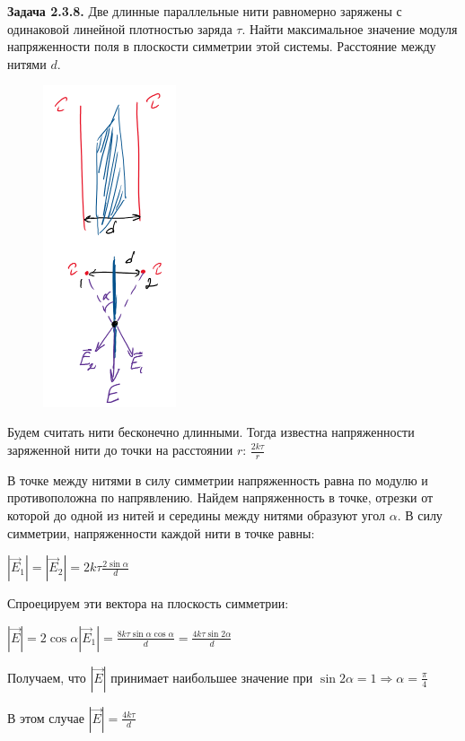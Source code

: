 \documentclass[12pt]{article}
\begin{document}





\clearpage

\begin{tcolorbox}
    \textbf{Задача 2.3.8.} Две длинные параллельные нити равномерно
    заряжены с одинаковой линейной плотностью заряда $\tau$. Найти
    максимальное значение модуля напряженности поля в плоскости
    симметрии этой системы. Расстояние между нитями $d$.
\end{tcolorbox}

\begin{minipage}{\textwidth}
    \begin{figure}
        \includegraphics[width=0.35\textwidth]{physics1/images/physics1_homework_7_1}
    \end{figure}

    Будем считать нити бесконечно длинными. Тогда известна напряженности заряженной нити до точки на расстоянии $r$: $\frac{2k\tau}{r}$

    В точке между нитями в силу симметрии напряженность равна по модулю и противоположна по напрявлению. Найдем напряженность в точке,
    отрезки от которой до одной из нитей и середины между нитями образуют угол $\alpha$. В силу симметрии, напряженности
    каждой нити в точке равны:

    $|\vec{E}_1| = |\vec{E}_2| = 2k\tau \frac{2\sin\alpha}{d}$

    Спроецируем эти вектора на плоскость симметрии:

    $|\vec{E}| = 2\cos\alpha |\vec{E}_1| = \frac{8k\tau \sin\alpha\cos\alpha}{d} = \frac{4k\tau \sin2\alpha}{d}$

    Получаем, что $|\vec{E}|$ принимает наибольшее значение при $\sin2\alpha = 1 \Longrightarrow \alpha = \frac{\pi}{4}$

    В этом случае $|\vec{E}| = \frac{4k\tau}{d}$
\end{minipage}
\end{document}
